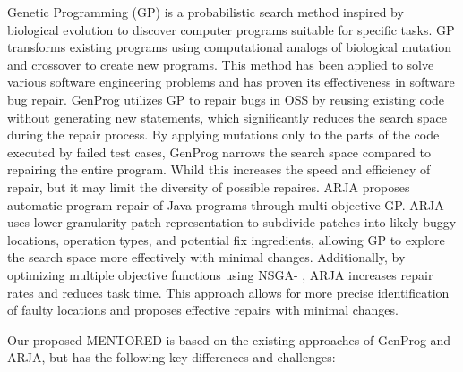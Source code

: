 \documentclass[10pt,conference]{IEEEtran}
\begin{document}
        Genetic Programming (GP) is a probabilistic search method inspired by biological evolution to discover computer programs suitable for specific tasks\cite{forrest1993genetic, koza1992programming}. GP transforms existing programs using computational analogs of biological mutation and crossover to create new programs. This method has been applied to solve various software engineering problems and has proven its effectiveness in software bug repair. GenProg \cite{le2011genprog} utilizes GP to repair bugs in OSS by reusing existing code without generating new statements, which significantly reduces the search space during the repair process. By applying mutations only to the parts of the code executed by failed test cases, GenProg narrows the search space compared to repairing the entire program. Whild this increases the speed and efficiency of repair, but it may limit the diversity of possible repaires. ARJA\cite{yuan2018arja} proposes automatic program repair of Java programs through multi-objective GP. ARJA uses lower-granularity patch representation\cite{oliveira2016improved} to subdivide patches into likely-buggy locations, operation types, and potential fix ingredients, allowing GP to explore the search space more effectively with minimal changes. Additionally, by optimizing multiple objective functions using NSGA-\uppercase\expandafter{} \cite{deb2002fast}, ARJA increases repair rates and reduces task time. This approach allows for more precise identification of faulty locations and proposes effective repairs with minimal changes.

        Our proposed MENTORED is based on the existing approaches of GenProg and ARJA, but has the following key differences and challenges:
\end{document}

